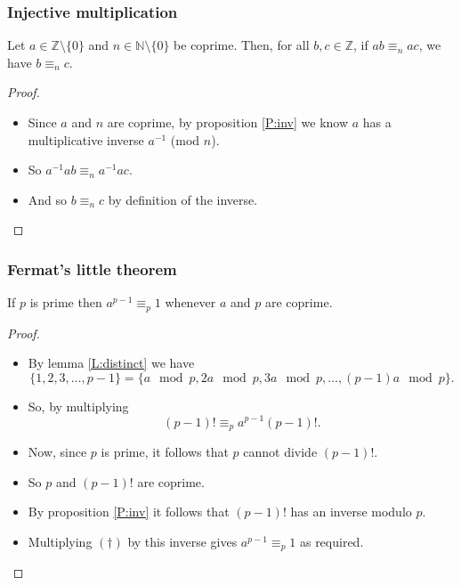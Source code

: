 \documentclass[handout]{beamer}
\newcommand{\bN}{\mathbb{N}}
\newcommand{\bZ}{\mathbb{Z}}
\begin{document}
\begin{frame}
\frametitle{Injective multiplication}

\begin{lemma}\label{L:distinct}
Let $a\in\bZ\setminus\{0\}$ and $n\in\bN\setminus\{0\}$ be coprime. Then, for all $b,c\in \bZ$, if $ab \equiv_n ac$, we have $b\equiv_n c$.
\end{lemma}
\begin{proof}
\begin{itemize}
\item Since $a$ and $n$ are coprime, by proposition \ref{P:inv} we know $a$ has a multiplicative inverse $a^{-1}$ (mod $n$). 
\vspace{0.5cm} 
\item So $a^{-1}ab \equiv_n a^{-1}ac$. 
\vspace{0.5cm}
\item And so $b\equiv_n c$ by definition of the inverse. 
\end{itemize}
\end{proof}
\end{frame}

\begin{frame}
\frametitle{Fermat's little theorem}
\begin{theorem}\label{T:fermat}
If $p$ is prime then $a^{p-1}\equiv_p 1$ whenever $a$ and $p$ are coprime.
\end{theorem}
\begin{proof}
\begin{itemize}
\item By lemma \ref{L:distinct} we have 
\scriptsize
\[\{1,2,3,\ldots,p-1\}=\{a \mod p,2a \mod p,3a \mod p,\ldots, (p-1)a \mod p\}.\] 
\normalsize
\item So, by multiplying 
\[\tag{$\dagger$}(p-1)! \equiv_p a^{p-1}(p-1)!.\] 
\item Now, since $p$ is prime, it follows that $p$ cannot divide $(p-1)!$. 
\item So $p$ and $(p-1)!$ are coprime. 
\item By proposition \ref{P:inv}  it follows that $(p-1)!$ has an inverse modulo $p$. 
\item Multiplying $(\dagger)$ by this inverse gives $a^{p-1}\equiv_p 1$ as required. 
\end{itemize}
\end{proof}
\end{frame}
\end{document}
